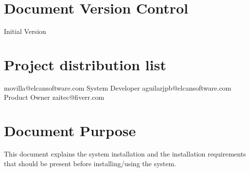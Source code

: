 \section{Document Version Control}
\begin{elcanversions}
	 {Initial Version}
\end{elcanversions}

\section{Project distribution list}

\begin{elcandistribution}

	 {movilla@elcansoftware.com} {\distribdate} 
	 {System Developer} {aguilarjpb@elcansoftware.com} {\distribdate}
	 {Product Owner} {zaitec@fiverr.com} {\distribdate}	
\end{elcandistribution}

\section{Document Purpose}
This document explains the system installation and the installation requirements that should be present before installing/using the system.